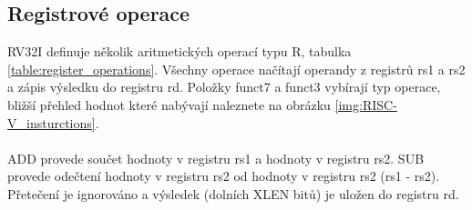 \documentclass[FM,BP]{tulthesis}
\newcommand{\argument}[1]{{\ttfamily\color{\tulcolor}#1}}
\newcommand{\argumentindex}[1]{\argument{#1}\index{#1}}
\begin{document}
\subsection{Registrové operace}
RV32I definuje několik aritmetických operací typu R, tabulka \ref{table:register_operations}. Všechny operace načítají operandy z registrů rs1 a rs2 a zápis výsledku do registru rd. Položky funct7 a funct3 vybírají typ operace, bližší přehled hodnot které nabývají naleznete na obrázku \ref{img:RISC-V_insturctions}.


\begin{table}[h]
    \caption{Registrové operace (převzato z \cite{RISC-V})}
    \label{table:register_operations}
    \begin{center}
    \end{center}
\end{table}

\paragraph{}
\argumentindex{ADD} provede součet hodnoty v registru rs1 a hodnoty v registru rs2. \argumentindex{SUB} provede odečtení hodnoty v registru rs2 od hodnoty v registru rs2 (rs1 - rs2). Přetečení je ignorováno a výsledek (dolních XLEN bitů) je uložen do registru rd.
\end{document}
